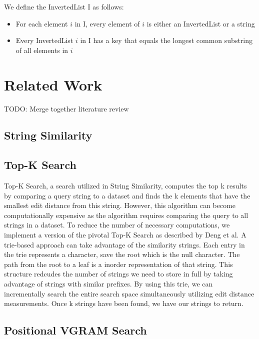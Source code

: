 \documentclass[pdftex,12pt,letter]{article}
\begin{document}
We define the InvertedList I as follows:

\begin{itemize}
\item For each element $i$ in I, every element of $i$ is either an InvertedList or a string
\item Every InvertedList $i$ in I has a key that equals the longest common substring of all elements in $i$
\end{itemize}

\section{Related Work}
TODO: Merge together literature review

\subsection{String Similarity}

\subsection{Top-K Search}
Top-K Search, a search utilized in String Similarity, computes the top k results by comparing a query string to a dataset and finds the k elements that have the smallest edit distance from this string. However, this algorithm can become computationally expensive as the algorithm requires comparing the query to all strings in a dataset. To reduce the number of necessary computations, we implement a version of the pivotal Top-K Search as described by Deng et al. A trie-based approach can take advantage of the similarity strings. Each entry in the trie represents a character, save the root which is the null character. The path from the root to a leaf is a inorder representation of that string. This structure redcudes the number of strings we need to store in full by taking advantage of strings with similar prefixes. By using this trie, we can incrementally search the entire search space simultaneously utilizing edit distance measurements. Once k strings have been found, we have our strings to return. 

\subsection{Positional VGRAM Search}
\end{document}
